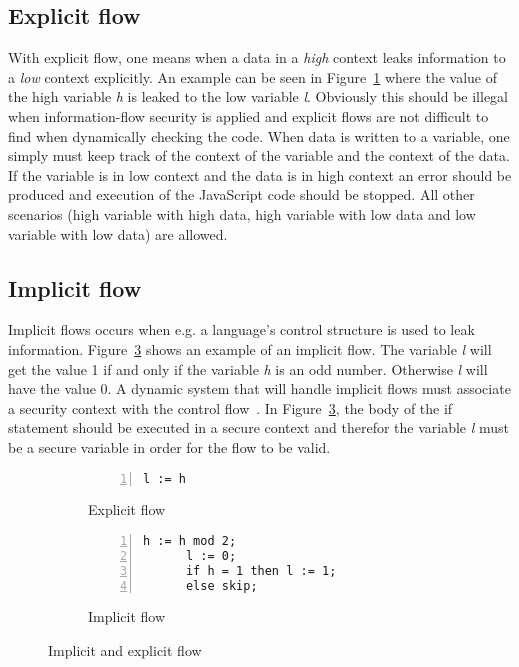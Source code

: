 \subsection{Explicit flow}
With explicit flow, one means when a data in a \emph{high} context leaks information to a \emph{low} context explicitly. An example can be seen in Figure~\ref{fig:expflow} where the value of the high variable \emph{h} is leaked to the low variable \emph{l}. Obviously this should be illegal when information-flow security is applied and explicit flows are not difficult to find when dynamically checking the code. When data is written to a variable, one simply must keep track of the context of the variable and the context of the data. If the variable is in low context and the data is in high context an error should be produced and execution of the JavaScript code should be stopped. All other scenarios (high variable with high data, high variable with low data and low variable with low data) are allowed.
\subsection{Implicit flow}
\label{chapter:implicit_flow}
Implicit flows occurs when e.g. a language's control structure is used to leak information. Figure~\ref{fig:impflow} shows an example of an implicit flow. The variable \emph{l} will get the value 1 if and only if the variable \emph{h} is an odd number. Otherwise \emph{l} will have the value 0. A dynamic system that will handle implicit flows must associate a security context with the control flow~\cite{jsflow-csf12}. In Figure~\ref{fig:impflow}, the body of the if statement should be executed in a secure context and therefor the variable \emph{l} must be a secure variable in order for the flow to be valid.

\begin{figure}[h]
  \captionsetup[subfigure]{singlelinecheck=off,justification=raggedright}
  \begin{subfigure}[b]{0.5\textwidth}
    \begin{lstlisting}[numbers=left]
      l := h
    \end{lstlisting}
    \caption{Explicit flow}
    \label{fig:expflow}
  \end{subfigure}
  \begin{subfigure}[b]{0.5\textwidth}
    \begin{lstlisting}[numbers=left]
      h := h mod 2;
      l := 0;
      if h = 1 then l := 1;
      else skip;
    \end{lstlisting}
    \caption{Implicit flow}
    \label{fig:impflow}
  \end{subfigure}
  \caption{Implicit and explicit flow}
\end{figure}

